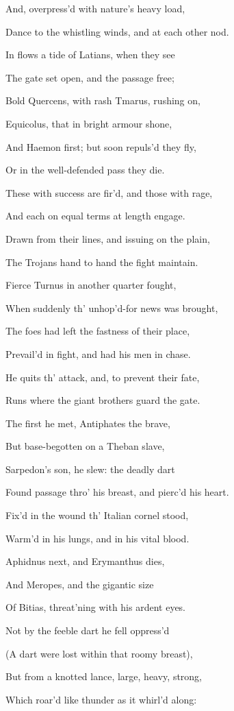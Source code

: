 And, overpress’d with nature’s heavy load,

Dance to the whistling winds, and at each other nod.

In flows a tide of Latians, when they see

The gate set open, and the passage free;

Bold Quercens, with rash Tmarus, rushing on,

Equicolus, that in bright armour shone,

And Haemon first; but soon repuls’d they fly,

Or in the well-defended pass they die.

These with success are fir’d, and those with rage,

And each on equal terms at length engage.

Drawn from their lines, and issuing on the plain,

The Trojans hand to hand the fight maintain.

Fierce Turnus in another quarter fought,

When suddenly th’ unhop’d-for news was brought,

The foes had left the fastness of their place,

Prevail’d in fight, and had his men in chase.

He quits th’ attack, and, to prevent their fate,

Runs where the giant brothers guard the gate.

The first he met, Antiphates the brave,

But base-begotten on a Theban slave,

Sarpedon’s son, he slew: the deadly dart

Found passage thro’ his breast, and pierc’d his heart.

Fix’d in the wound th’ Italian cornel stood,

Warm’d in his lungs, and in his vital blood.

Aphidnus next, and Erymanthus dies,

And Meropes, and the gigantic size

Of Bitias, threat’ning with his ardent eyes.

Not by the feeble dart he fell oppress’d

(A dart were lost within that roomy breast),

But from a knotted lance, large, heavy, strong,

Which roar’d like thunder as it whirl’d along:

